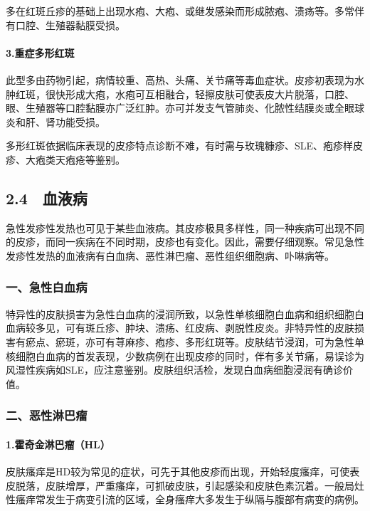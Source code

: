 多在红斑丘疹的基础上出现水疱、大疱、或继发感染而形成脓疱、溃疡等。多常伴有口腔、生殖器黏膜受损。

\paragraph{3.重症多形红斑}

此型多由药物引起，病情较重、高热、头痛、关节痛等毒血症状。皮疹初表现为水肿红斑，很快形成大疱，水疱可互相融合，轻擦皮肤可使表皮大片脱落，口腔、眼、生殖器等口腔黏膜亦广泛红肿。亦可并发支气管肺炎、化脓性结膜炎或全眼球炎和肝、肾功能受损。

多形红斑依据临床表现的皮疹特点诊断不难，有时需与玫瑰糠疹、SLE、疱疹样皮疹、大疱类天疱疮等鉴别。

\protect\hypertarget{text00024.html}{}{}

\subsection{2.4　血液病}

急性发疹性发热也可见于某些血液病。其皮疹极具多样性，同一种疾病可出现不同的皮疹，而同一疾病在不同时期，皮疹也有变化。因此，需要仔细观察。常见急性发疹性发热的血液病有白血病、恶性淋巴瘤、恶性组织细胞病、卟啉病等。

\subsubsection{一、急性白血病}

特异性的皮肤损害为急性白血病的浸润所致，以急性单核细胞白血病和组织细胞白血病较多见，可有斑丘疹、肿块、溃疡、红皮病、剥脱性皮炎。非特异性的皮肤损害有瘀点、瘀斑，亦可有荨麻疹、疱疹、多形红斑等。皮肤结节浸润，可为急性单核细胞白血病的首发表现，少数病例在出现皮疹的同时，伴有多关节痛，易误诊为风湿性疾病如SLE，应注意鉴别。皮肤组织活检，发现白血病细胞浸润有确诊价值。

\subsubsection{二、恶性淋巴瘤}

\paragraph{1.霍奇金淋巴瘤（HL）}

皮肤瘙痒是HD较为常见的症状，可先于其他皮疹而出现，开始轻度瘙痒，可使表皮脱落，皮肤增厚，严重瘙痒，可抓破皮肤，引起感染和皮肤色素沉着。一般局灶性瘙痒常发生于病变引流的区域，全身瘙痒大多发生于纵隔与腹部有病变的病例。

